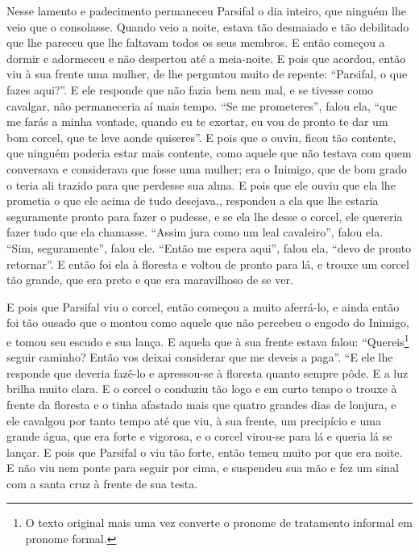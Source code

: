 Nesse lamento e padecimento permaneceu Parsifal o dia inteiro, que ninguém
lhe veio que o consolasse. Quando veio a noite, estava tão desmaiado e tão
debilitado que lhe pareceu que lhe faltavam todos os seus membros. E então
começou a dormir e adormeceu e não despertou até a meia-noite. E pois que
acordou, então viu à sua frente uma mulher, de lhe perguntou muito de repente:
“Parsifal, o que fazes aqui?”. E ele responde que não fazia bem nem mal, e se
tivesse como cavalgar, não permaneceria aí mais tempo. “Se me prometeres”,
falou ela, “que me farás a minha vontade, quando eu te exortar, eu vou de
pronto te dar um bom corcel, que te leve aonde quiseres”. E pois que o ouviu,
ficou tão contente, que ninguém poderia estar mais contente, como aquele que
não testava com quem conversava e considerava que fosse uma mulher; era o
Inimigo, que de bom grado o teria ali trazido para que perdesse sua alma. E
pois que ele ouviu que ela lhe prometia o que ele acima de tudo desejava,,
respondeu a ela que lhe estaria seguramente pronto para fazer o pudesse, e se
ela lhe desse o corcel, ele quereria fazer tudo que ela chamasse. “Assim jura
como um leal cavaleiro”, falou ela. “Sim, seguramente”, falou ele. “Então me
espera aqui”, falou ela, “devo de pronto retornar”. E então foi ela à floresta
e voltou de pronto para lá, e trouxe um corcel tão grande, que era preto e que
era maravilhoso de se ver.

E pois que Parsifal viu o corcel, então começou a muito aferrá-lo, e ainda
então foi tão ousado que o montou como aquele que não percebeu o engodo do
Inimigo, e tomou seu escudo e sua lança. E aquela que à sua frente estava
falou: “Quereis\footnote{ O texto original mais uma vez converte o pronome de
tratamento informal em pronome formal.}  seguir caminho? Então vos
deixai considerar que me deveis a paga”. “E ele lhe responde que deveria
fazê-lo e apressou-se à floresta quanto sempre pôde. E a luz brilha muito
clara. E o corcel o conduziu tão logo e em curto tempo o trouxe à frente da
floresta e o tinha afastado mais que quatro grandes dias de lonjura, e ele
cavalgou por tanto tempo até que viu, à sua frente, um precipício e uma grande
água, que era forte e vigorosa, e o corcel virou-se para lá e queria lá se
lançar. E pois que Parsifal o viu tão forte, então temeu muito por que era
noite. E não viu nem ponte para seguir por cima, e suspendeu sua mão e fez um
sinal com a santa cruz à frente de sua testa.

